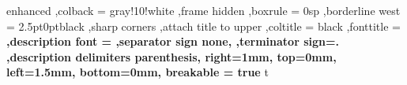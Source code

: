 \usepackage{ifthen}
\usepackage{tcolorbox}
\usepackage{varwidth}


\theoremstyle{definition}

\newtheorem{counter}{Contador}[section]
\newtheorem{problem}{Problema}[section]
\newtheorem{corollary}{Corolario}[chapter]
\newtheorem{example}{Ejemplo}[chapter]
\newtheorem{definition}{Definición}[chapter]
\newtheorem{remark}{Observación}
\newtheorem*{note}{Nota}

\newenvironment{solution}[1][]
{
    \begin{proof}[\textnormal{\textbf{Solución\ifthenelse{\equal{#1}{}}{}{ #1}}}]
    }{
    \end{proof}
}

{
    enhanced
    ,colback = gray!10!white
    ,frame hidden
    ,boxrule = 0sp
    ,borderline west = {2.5pt}{0pt}{black}
    ,sharp corners
    ,attach title to upper
    ,coltitle = black
    ,fonttitle = \bfseries
    ,description font = \mdseries
    ,separator sign none,
    ,terminator sign={.\hspace{2mm}}
    ,description delimiters parenthesis,
    right=1mm,
    top=0mm,
    left=1.5mm,
    bottom=0mm,
    breakable = true
}{t}